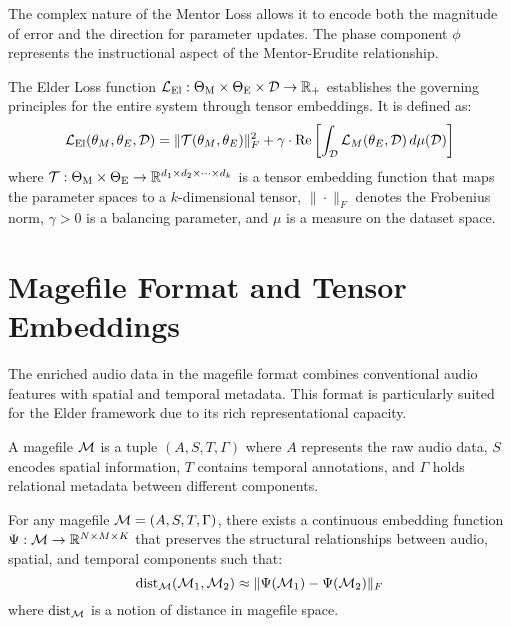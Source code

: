 \begin{remark}
The complex nature of the Mentor Loss allows it to encode both the magnitude of error and the direction for parameter updates. The phase component $\phi$ represents the instructional aspect of the Mentor-Erudite relationship.
\end{remark}

\begin{definition}
The Elder Loss function $\mathcal{L}_{\text{El}}: \Theta_{\text{M}} \times \Theta_{\text{E}} \times \mathcal{D} \rightarrow \mathbb{R}_+$ establishes the governing principles for the entire system through tensor embeddings. It is defined as:
\begin{equation}
\mathcal{L}_{\text{El}}(\theta_M, \theta_E, \mathcal{D}) = \| \mathcal{T}(\theta_M, \theta_E) \|_F^2 + \gamma \cdot \mathrm{Re}\left[\int_{\mathcal{D}} \mathcal{L}_M(\theta_E, \mathcal{D}) \, d\mu(\mathcal{D})\right]
\end{equation}
where $\mathcal{T}: \Theta_{\text{M}} \times \Theta_{\text{E}} \rightarrow \mathbb{R}^{d_1 \times d_2 \times \cdots \times d_k}$ is a tensor embedding function that maps the parameter spaces to a $k$-dimensional tensor, $\|\cdot\|_F$ denotes the Frobenius norm, $\gamma > 0$ is a balancing parameter, and $\mu$ is a measure on the dataset space.
\end{definition}

\section{Magefile Format and Tensor Embeddings}

The enriched audio data in the magefile format combines conventional audio features with spatial and temporal metadata. This format is particularly suited for the Elder framework due to its rich representational capacity.

\begin{definition}
A magefile $\mathcal{M}$ is a tuple $(A, S, T, \Gamma)$ where $A$ represents the raw audio data, $S$ encodes spatial information, $T$ contains temporal annotations, and $\Gamma$ holds relational metadata between different components.
\end{definition}

\begin{theorem}
For any magefile $\mathcal{M} = (A, S, T, \Gamma)$, there exists a continuous embedding function $\Psi: \mathcal{M} \rightarrow \mathbb{R}^{N \times M \times K}$ that preserves the structural relationships between audio, spatial, and temporal components such that:
\begin{equation}
\mathrm{dist}_{\mathcal{M}}(\mathcal{M}_1, \mathcal{M}_2) \approx \| \Psi(\mathcal{M}_1) - \Psi(\mathcal{M}_2) \|_F
\end{equation}
where $\mathrm{dist}_{\mathcal{M}}$ is a notion of distance in magefile space.
\end{theorem}

